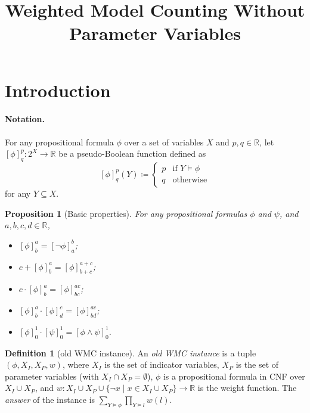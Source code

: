 \documentclass{article}
\title{Weighted Model Counting Without Parameter Variables}
\newtheorem{proposition}{Proposition}
\theoremstyle{definition}
\newtheorem{definition}{Definition}
\theoremstyle{remark}
\begin{document}
\maketitle

\section{Introduction}

\paragraph{Notation.} For any propositional formula $\phi$ over a set of
variables $X$ and $p, q \in \mathbb{R}$, let $[\phi]^p_q\colon 2^X \to
\mathbb{R}$ be a pseudo-Boolean function defined as
\[
  [\phi]^p_q(Y) \coloneqq
  \begin{cases}
    p & \text{if } Y \models \phi \\
    q & \text{otherwise}
  \end{cases}
\]
for any $Y \subseteq X$.

\begin{proposition}[Basic properties] \label{prop:basic}
  For any propositional formulas $\phi$ and $\psi$, and $a, b, c, d \in
  \mathbb{R}$,
  \begin{itemize}
  \item $[\phi]^a_b = [\neg \phi]^b_a$;
  \item $c + [\phi]^a_b = [\phi]^{a+c}_{b+c}$;
  \item $c \cdot [\phi]^a_b = [\phi]^{ac}_{bc}$;
  \item $[\phi]^a_b \cdot [\phi]^c_d = [\phi]^{ac}_{bd}$;
  \item $[\phi]^1_0 \cdot [\psi]_0^1 = [\phi \land \psi]_0^1$.
  \end{itemize}
\end{proposition}

\begin{definition}[old WMC instance]
  An \emph{old WMC instance} is a tuple $(\phi, X_I, X_P, w)$, where $X_I$ is
  the set of indicator variables, $X_P$ is the set of parameter variables (with
  $X_I \cap X_P = \emptyset$), $\phi$ is a propositional formula in CNF over
  $X_I \cup X_P$, and $w\colon X_I \cup X_P \cup \{\neg x \mid x \in X_I \cup
  X_P\} \to \mathbb{R}$ is the weight function. The \emph{answer} of the
  instance is $\sum_{Y \models \phi} \prod_{Y \models l} w(l)$.
\end{definition} %
\end{document}
